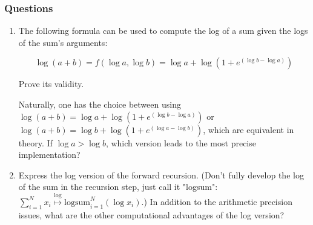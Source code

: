 \documentclass[11pt]{article}
\begin{document}
\subsubsection{Questions}
\label{sec:org64f3da8}
\begin{enumerate}
\item The following formula can be used to compute the log of a sum given
the logs of the sum's arguments:

$$
   \log(a+b) = f(\log a,\log b) = \log a + \log \left( 1 + e^{(\log b - \log a)} \right)
   $$

Prove its validity.

Naturally, one has the choice between using
\(\log(a+b) = \log a + \log \left( 1 + e^{(\log b - \log a)} \right)\)
or
\(\log(a+b) = \log b + \log \left( 1 + e^{(\log a - \log b)} \right)\),
which are equivalent in theory. If \(\log a > \log b\), which version
leads to the most precise implementation?

\item Express the log version of the forward recursion. (Don't fully
develop the log of the sum in the recursion step, just call it
"logsum":
\(\sum_{i=1}^{N} x_i \stackrel{\log}{\longmapsto} \mbox{logsum}_{i=1}^{N} ( \log x_i )\).)
In addition to the arithmetic precision issues, what are the other
computational advantages of the log version?
\end{enumerate}
\end{document}
